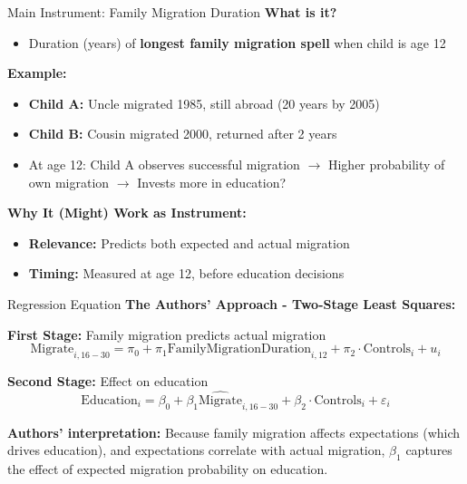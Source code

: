 \documentclass{beamer}
\begin{document}
\begin{frame}{Main Instrument: Family Migration Duration}
\textbf{What is it?}
\begin{itemize}
    \item Duration (years) of \textbf{longest family migration spell} when child is age 12
\end{itemize}

\vspace{0.2cm}
\textbf{Example:}
\begin{itemize}
    \item \textbf{Child A:} Uncle migrated 1985, still abroad (20 years by 2005) 
    \item \textbf{Child B:} Cousin migrated 2000, returned after 2 years 
    \item At age 12: Child A observes successful migration $\rightarrow$ Higher probability of own migration $\rightarrow$ Invests more in education?
\end{itemize}

\vspace{0.2cm}
\textbf{Why It (Might) Work as Instrument:}
\begin{itemize}
    \item \textbf{Relevance:} Predicts both expected and actual migration
    \item \textbf{Timing:} Measured at age 12, before education decisions
\end{itemize}
\end{frame}

\begin{frame}{Regression Equation}
\textbf{The Authors' Approach - Two-Stage Least Squares:}

\textbf{First Stage:} Family migration predicts actual migration
$$\text{Migrate}_{i,16-30} = \pi_0 + \pi_1 \text{FamilyMigrationDuration}_{i,12} + \pi_2 \cdot \text{Controls}_i + u_i$$

\textbf{Second Stage:} Effect on education
$$\text{Education}_i = \beta_0 + \beta_1  \widehat{\text{Migrate}}_{i,16-30} + \beta_2 \cdot \text{Controls}_i + \varepsilon_i$$

\vspace{0.2cm}
\textbf{Authors' interpretation:} Because family migration affects expectations (which drives education), and expectations correlate with actual migration, $\beta_1$ captures the effect of expected migration probability on education.
\end{frame}
\end{document}
